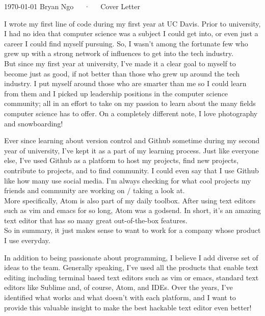 \documentclass[11pt, a4paper]{awesome-cv}
\begin{document}
\makecvheader[R]

\makecvfooter
  {\today}
  {Bryan Ngo~~~·~~~Cover Letter}
  {}

\makelettertitle

\begin{cvletter}

I wrote my first line of code during my first year at UC Davis.
Prior to university, I had no idea that computer science was a subject I could get into, or even just a career I could find myself pursuing.
So, I wasn't among the fortunate few who grew up with a strong network of influences to get into the tech industry. \\

But since my first year at university, I've made it a clear goal to myself to become just as good, if not better than those who grew up around the tech industry.
I put myself around those who are smarter than me so I could learn from them and I picked up leadership positions in the computer science community; all in an effort to take on my passion to learn about the many fields computer science has to offer.
On a completely different note, I love photography and snowboarding!

Ever since learning about version control and Github sometime during my second year of university, I've kept it as a part of my learning process.
Just like everyone else, I've used Github as a platform to host my projects, find new projects, contribute to projects, and to find community.
I could even say that I use Github like how many use social media.
I'm always checking for what cool projects my friends and community are working on / taking a look at. \\

More specifically, Atom is also part of my daily toolbox.
After using text editors such as vim and emacs for so long, Atom was a godsend.
In short, it's an amazing text editor that has so many great out-of-the-box features. \\

So in summary, it just makes sense to want to work for a company whose product I use everyday.

In addition to being passionate about programming, I believe I add diverse set of ideas to the team.
Generally speaking, I've used all the products that enable text editing including terminal based text editors such as vim or emacs, standard text editors like Sublime and, of course, Atom, and IDEs.
Over the years, I've identified what works and what doesn't with each platform, and I want to provide this valuable insight to make the best hackable text editor even better!

\end{cvletter}


\makeletterclosing
\end{document}
